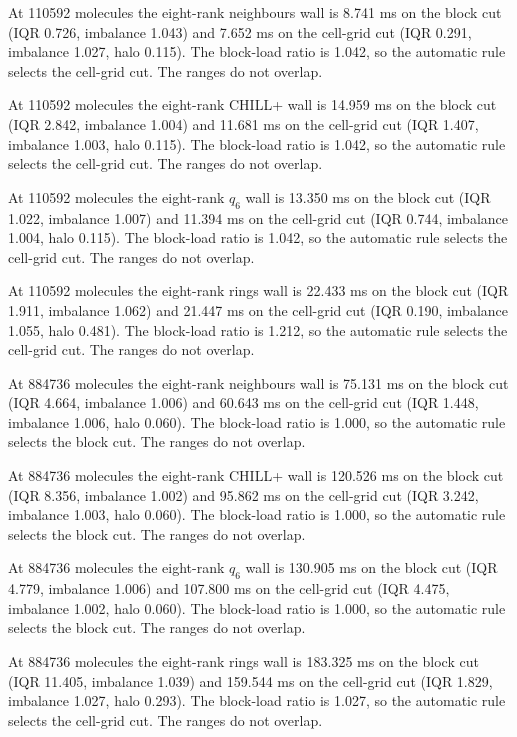 At 110592 molecules the eight-rank neighbours wall is 8.741 ms on the block cut (IQR 0.726, imbalance 1.043) and 7.652 ms on the cell-grid cut (IQR 0.291, imbalance 1.027, halo 0.115). The block-load ratio is 1.042, so the automatic rule selects the cell-grid cut. The ranges do not overlap.

At 110592 molecules the eight-rank CHILL+ wall is 14.959 ms on the block cut (IQR 2.842, imbalance 1.004) and 11.681 ms on the cell-grid cut (IQR 1.407, imbalance 1.003, halo 0.115). The block-load ratio is 1.042, so the automatic rule selects the cell-grid cut. The ranges do not overlap.

At 110592 molecules the eight-rank $q_6$ wall is 13.350 ms on the block cut (IQR 1.022, imbalance 1.007) and 11.394 ms on the cell-grid cut (IQR 0.744, imbalance 1.004, halo 0.115). The block-load ratio is 1.042, so the automatic rule selects the cell-grid cut. The ranges do not overlap.

At 110592 molecules the eight-rank rings wall is 22.433 ms on the block cut (IQR 1.911, imbalance 1.062) and 21.447 ms on the cell-grid cut (IQR 0.190, imbalance 1.055, halo 0.481). The block-load ratio is 1.212, so the automatic rule selects the cell-grid cut. The ranges do not overlap.

At 884736 molecules the eight-rank neighbours wall is 75.131 ms on the block cut (IQR 4.664, imbalance 1.006) and 60.643 ms on the cell-grid cut (IQR 1.448, imbalance 1.006, halo 0.060). The block-load ratio is 1.000, so the automatic rule selects the block cut. The ranges do not overlap.

At 884736 molecules the eight-rank CHILL+ wall is 120.526 ms on the block cut (IQR 8.356, imbalance 1.002) and 95.862 ms on the cell-grid cut (IQR 3.242, imbalance 1.003, halo 0.060). The block-load ratio is 1.000, so the automatic rule selects the block cut. The ranges do not overlap.

At 884736 molecules the eight-rank $q_6$ wall is 130.905 ms on the block cut (IQR 4.779, imbalance 1.006) and 107.800 ms on the cell-grid cut (IQR 4.475, imbalance 1.002, halo 0.060). The block-load ratio is 1.000, so the automatic rule selects the block cut. The ranges do not overlap.

At 884736 molecules the eight-rank rings wall is 183.325 ms on the block cut (IQR 11.405, imbalance 1.039) and 159.544 ms on the cell-grid cut (IQR 1.829, imbalance 1.027, halo 0.293). The block-load ratio is 1.027, so the automatic rule selects the cell-grid cut. The ranges do not overlap.

